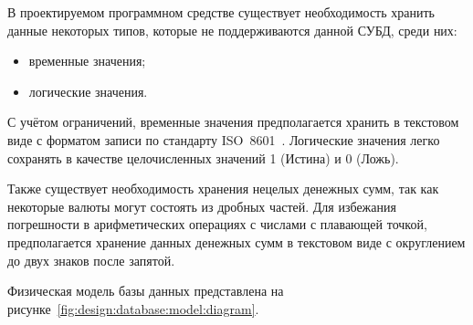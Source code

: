 В проектируемом программном средстве существует необходимость хранить данные некоторых типов, которые не поддерживаются данной СУБД, среди них:
\begin{itemize}
    \item временные значения;
    \item логические значения.
\end{itemize}

С учётом ограничений, временные значения предполагается хранить в текстовом виде с форматом записи по стандарту ISO~8601~\cite{iso_8601}.
Логические значения легко сохранять в качестве целочисленных значений 1 (Истина) и 0 (Ложь).

Также существует необходимость хранения нецелых денежных сумм, так как некоторые валюты могут состоять из дробных частей.
Для избежания погрешности в арифметических операциях с числами с плавающей точкой, предполагается хранение данных денежных сумм в текстовом виде с округлением до двух знаков после запятой.

Физическая модель базы данных представлена на рисунке~\ref{fig:design:database:model:diagram}.

